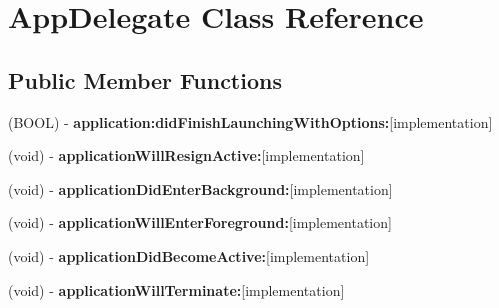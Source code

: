 \hypertarget{interface_app_delegate}{\section{App\-Delegate Class Reference}
\label{interface_app_delegate}
}
\subsection*{Public Member Functions}
\begin{DoxyCompactItemize}
\item 
\hypertarget{interface_app_delegate_a2ca637e0d5db62251b5881aa16897f75}{(B\-O\-O\-L) -\/ {\bfseries application\-:did\-Finish\-Launching\-With\-Options\-:}{\ttfamily  \mbox{[}implementation\mbox{]}}}\label{interface_app_delegate_a2ca637e0d5db62251b5881aa16897f75}

\item 
\hypertarget{interface_app_delegate_ad4e9549671ce8c4fc31bd6e4836b5a91}{(void) -\/ {\bfseries application\-Will\-Resign\-Active\-:}{\ttfamily  \mbox{[}implementation\mbox{]}}}\label{interface_app_delegate_ad4e9549671ce8c4fc31bd6e4836b5a91}

\item 
\hypertarget{interface_app_delegate_a26d9be79224184ef974a09c1793eb360}{(void) -\/ {\bfseries application\-Did\-Enter\-Background\-:}{\ttfamily  \mbox{[}implementation\mbox{]}}}\label{interface_app_delegate_a26d9be79224184ef974a09c1793eb360}

\item 
\hypertarget{interface_app_delegate_ad9916739a43349edad2877110be31059}{(void) -\/ {\bfseries application\-Will\-Enter\-Foreground\-:}{\ttfamily  \mbox{[}implementation\mbox{]}}}\label{interface_app_delegate_ad9916739a43349edad2877110be31059}

\item 
\hypertarget{interface_app_delegate_a73aa814398c205f47f21ed59b616e492}{(void) -\/ {\bfseries application\-Did\-Become\-Active\-:}{\ttfamily  \mbox{[}implementation\mbox{]}}}\label{interface_app_delegate_a73aa814398c205f47f21ed59b616e492}

\item 
\hypertarget{interface_app_delegate_ae08d55e0d58680354fceb7c8341055eb}{(void) -\/ {\bfseries application\-Will\-Terminate\-:}{\ttfamily  \mbox{[}implementation\mbox{]}}}\label{interface_app_delegate_ae08d55e0d58680354fceb7c8341055eb}

\end{DoxyCompactItemize}

